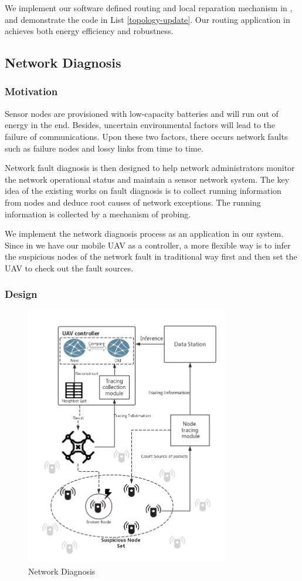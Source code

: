 We implement our software defined routing and 
local reparation mechanism in {\sdn}, 
and demonstrate the code in List \ref{topology-update}. 
Our routing application in {\sdn} achieves both energy efficiency and robustness.


\subsection{Network Diagnosis}

\subsubsection{Motivation}

Sensor nodes are provisioned with low-capacity batteries and will run out of energy in the end. 
Besides, uncertain environmental factors will lead to the failure of communications.
Upon these two factors, there occurs network faults such as failure nodes and lossy links from time to time.

Network fault diagnosis is then designed to help network administrators monitor the network 
operational status and maintain a sensor network system. The key idea of the existing works
on fault diagnosis is to collect running information from nodes and deduce root causes of network
exceptions. The running information is collected by a mechanism of probing.

We implement the network diagnosis process as an application in our {\sdn} system.
Since in {\sdn} we have our mobile UAV as a controller, a more flexible way is to infer the suspicious 
nodes of the network fault in traditional way first and then set the UAV to check out the fault sources. 
 


\subsubsection{Design}

\begin{figure}[htbp]
	\centering
	\includegraphics[width=3.5in]{Figure/Diagnosisprocess}
	\caption{Network Diagnosis}
	\label{Diagnosis}
\end{figure}

